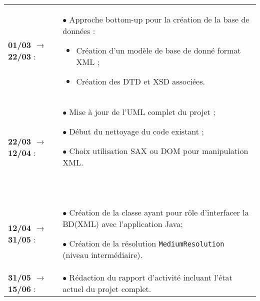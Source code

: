     \noindent
    \begin{tabular}{p{} p{}}
    \textbf{01/03 $\rightarrow$ 22/03} :
    & 
    $\bullet$ Approche bottom-up pour la création de la base de données :
    \begin{itemize}
     \item Création d'un modèle de base de donné format XML ;
     \item Création des DTD et XSD associées.
    \end{itemize}
    \\    
    \textbf{22/03 $\rightarrow$ 12/04} :
    &
    $\bullet$ Mise à jour de l'UML complet du projet ;
    
    $\bullet$ Début du nettoyage du code existant ;
    
    $\bullet$ Choix utilisation SAX ou DOM pour manipulation XML.
    
    ~
    
    \\
    \textbf{12/04 $\rightarrow$ 31/05} : 
    &
    $\bullet$ Création de la classe ayant pour rôle d'interfacer la BD(XML) avec l'application Java;
    
    $\bullet$ Création de la résolution \texttt{MediumResolution} (niveau intermédiaire).
    
    \\
    \textbf{31/05 $\rightarrow$ 15/06} : & $\bullet$ Rédaction du rapport d'activité incluant l'état actuel du projet complet.
    \end{tabular}

    
